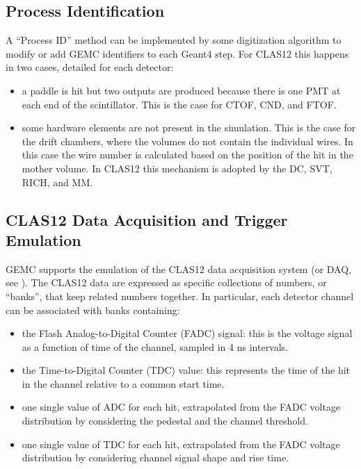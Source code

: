 \subsection{Process Identification}

A ``Process ID'' method can be implemented by some digitization algorithm to modify or add GEMC identifiers to
each Geant4 step. For CLAS12 this happens in two cases, detailed for each detector:

\begin{itemize}
	\item a paddle is hit but two outputs are produced because there is one PMT at each end of the scintillator. This
          is the case for CTOF, CND, and FTOF.
    \item some hardware elements are not present in the simulation. This is the case for the drift chambers, where the volumes do not contain
          the individual wires. In this case the wire number is calculated based on the position of the hit in the mother volume. In CLAS12 this mechanism
          is adopted by the DC, SVT, RICH, and MM.
\end{itemize}


\subsection{CLAS12 Data Acquisition and Trigger Emulation}

GEMC supports the emulation of the CLAS12 data acquisition system (or DAQ, see \cite{daq-nim}).
The CLAS12 data are expressed as specific collections of numbers, or ``banks'', that keep related numbers together.
In particular, each detector channel can be associated with banks containing:

\begin{itemize}
    \item the Flash Analog-to-Digital Counter (FADC) signal: this is the voltage signal as a function of time of the channel,
          sampled in 4 ns intervals.
    \item the Time-to-Digital Counter (TDC) value: this represents the time of the hit in the channel relative
          to a common start time.
    \item one single value of ADC for each hit, extrapolated from the FADC voltage distribution by considering the pedestal
          and the channel threshold.
    \item one single value of TDC for each hit, extrapolated from the FADC voltage distribution by considering channel
          signal shape and rise time.
\end{itemize}


